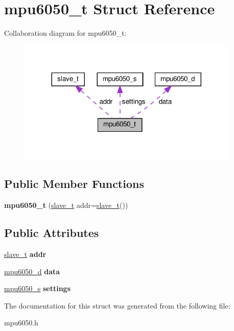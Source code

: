 \hypertarget{structmpu6050__t}{}\section{mpu6050\+\_\+t Struct Reference}
\label{structmpu6050__t}


Collaboration diagram for mpu6050\+\_\+t\+:\nopagebreak
\begin{figure}[H]
\begin{center}
\leavevmode
\includegraphics[width=299pt]{structmpu6050__t__coll__graph}
\end{center}
\end{figure}
\subsection*{Public Member Functions}
\begin{DoxyCompactItemize}
\item 
\mbox{\label{structmpu6050__t_ae66ee931655d40f389f45fa2bd652dbf}} 
{\bfseries mpu6050\+\_\+t} (\hyperlink{structslave__t}{slave\+\_\+t} addr=\hyperlink{structslave__t}{slave\+\_\+t}())
\end{DoxyCompactItemize}
\subsection*{Public Attributes}
\begin{DoxyCompactItemize}
\item 
\mbox{\label{structmpu6050__t_a61f3fb7626fd4df7fe919da15b61f400}} 
\hyperlink{structslave__t}{slave\+\_\+t} {\bfseries addr}
\item 
\mbox{\label{structmpu6050__t_ad9d6c6a1e71d62ebffdbf123aafe009e}} 
\hyperlink{structmpu6050__d}{mpu6050\+\_\+d} {\bfseries data}
\item 
\mbox{\label{structmpu6050__t_a185513b1c965c430645d75eecf5a401d}} 
\hyperlink{structmpu6050__s}{mpu6050\+\_\+s} {\bfseries settings}
\end{DoxyCompactItemize}


The documentation for this struct was generated from the following file\+:\begin{DoxyCompactItemize}
\item 
mpu6050.\+h\end{DoxyCompactItemize}
